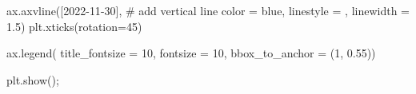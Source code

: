 \documentclass[
  letterpaper,
  DIV=11,
  numbers=noendperiod]{scrartcl}
\newenvironment{Shaded}{\begin{snugshade}}{\end{snugshade}}
\newcommand{\CommentTok}[1]{\textcolor[rgb]{0.37,0.37,0.37}{#1}}
\newcommand{\DecValTok}[1]{\textcolor[rgb]{0.68,0.00,0.00}{#1}}
\newcommand{\FloatTok}[1]{\textcolor[rgb]{0.68,0.00,0.00}{#1}}
\newcommand{\NormalTok}[1]{\textcolor[rgb]{0.00,0.23,0.31}{#1}}
\newcommand{\OperatorTok}[1]{\textcolor[rgb]{0.37,0.37,0.37}{#1}}
\newcommand{\StringTok}[1]{\textcolor[rgb]{0.13,0.47,0.30}{#1}}
\begin{document}
\begin{Shaded}
\begin{Highlighting}[]
\NormalTok{ax.axvline([}\StringTok{\textquotesingle{}2022{-}11{-}30\textquotesingle{}}\NormalTok{], }\CommentTok{\# add vertical line}
\NormalTok{           color }\OperatorTok{=} \StringTok{\textquotesingle{}blue\textquotesingle{}}\NormalTok{,}
\NormalTok{           linestyle }\OperatorTok{=} \StringTok{\textquotesingle{}{-}{-}\textquotesingle{}}\NormalTok{,}
\NormalTok{           linewidth }\OperatorTok{=} \FloatTok{1.5}\NormalTok{)}
\NormalTok{plt.xticks(rotation}\OperatorTok{=}\DecValTok{45}\NormalTok{)}



\NormalTok{ax.legend( title\_fontsize }\OperatorTok{=} \DecValTok{10}\NormalTok{, fontsize }\OperatorTok{=} \DecValTok{10}\NormalTok{,}
\NormalTok{          bbox\_to\_anchor }\OperatorTok{=}\NormalTok{ (}\DecValTok{1}\NormalTok{, }\FloatTok{0.55}\NormalTok{))}

\NormalTok{plt.show()}\OperatorTok{;}
\end{Highlighting}
\end{Shaded}
\end{document}
